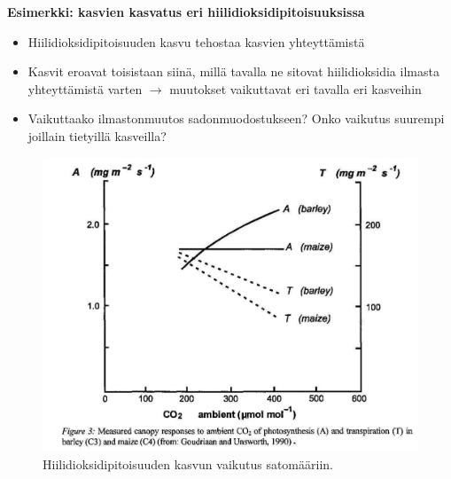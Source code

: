 \documentclass[
]{book}
\providecommand{\tightlist}{%
  \setlength{\itemsep}{0pt}\setlength{\parskip}{0pt}}
\begin{document}
\begin{eblock}{}

\textbf{Esimerkki: kasvien kasvatus eri hiilidioksidipitoisuuksissa}

\begin{itemize}
\tightlist
\item
  Hiilidioksidipitoisuuden kasvu tehostaa kasvien yhteyttämistä
\item
  Kasvit eroavat toisistaan siinä, millä tavalla ne sitovat hiilidioksidia ilmasta yhteyttämistä varten \(\rightarrow\) muutokset vaikuttavat eri tavalla eri kasveihin
\item
  Vaikuttaako ilmastonmuutos sadonmuodostukseen? Onko vaikutus suurempi joillain tietyillä kasveilla?
\end{itemize}

\end{eblock}

\FloatBarrier

\begin{figure}

{\centering \includegraphics[width=1\linewidth]{images/co2} 

}

\caption{Hiilidioksidipitoisuuden kasvun vaikutus satomääriin.}\label{fig:co2}
\end{figure}

\FloatBarrier
\end{document}
